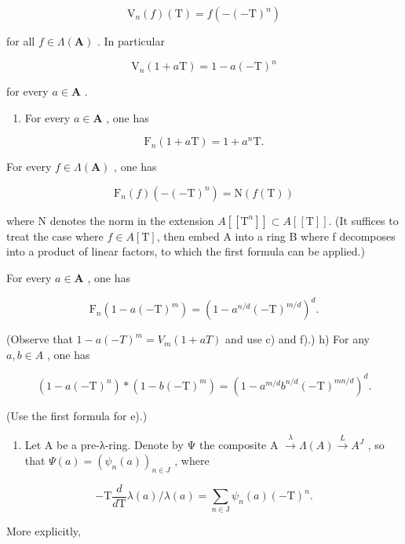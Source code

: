\[
\mathrm{V} _ {n} (f) (\mathrm{T}) = f (- (- \mathrm{T}) ^ {n})
\]

for all \(f \in \Lambda(\mathbf{A})\) . In particular

\[
\mathrm{V} _ {n} (1 + a \mathrm{T}) = 1 - a (- \mathrm{T}) ^ {n}
\]

for every \(a \in \mathbf{A}\) .

\begin{enumerate}
\def\labelenumi{\alph{enumi})}
\setcounter{enumi}{6}
\tightlist
\item
  For every \(a \in \mathbf{A}\) , one has
\end{enumerate}

\[
\mathrm{F} _ {n} (1 + a \mathrm{T}) = 1 + a ^ {n} \mathrm{T}.
\]

For every \(f \in \Lambda(\mathbf{A})\) , one has

\[
\mathrm{F} _ {n} (f) \left(- (- \mathrm{T}) ^ {n}\right) = \mathrm{N} (f (\mathrm{T}))
\]

where N denotes the norm in the extension \(A[[\mathrm{T}^{n}]] \subset A[[\mathrm{T}]]\). (It suffices to treat the case where \(f \in A[\mathrm{T}]\), then embed A into a ring B where f decomposes into a product of linear factors, to which the first formula can be applied.)

For every \(a \in \mathbf{A}\) , one has

\[
\mathrm{F} _ {n} (1 - a (- \mathrm{T}) ^ {m}) = (1 - a ^ {n / d} (- \mathrm{T}) ^ {m / d}) ^ {d}.
\]

(Observe that \(1 - a(-T)^{m} = V_{m}(1 + aT)\) and use c) and f).) h) For any \(a, b \in A\) , one has

\[
(1 - a (- \mathrm{T}) ^ {n}) * (1 - b (- \mathrm{T}) ^ {m}) = (1 - a ^ {m / d} b ^ {n / d} (- \mathrm{T}) ^ {m n / d}) ^ {d}.
\]

(Use the first formula for e).)

\begin{enumerate}
\def\labelenumi{\arabic{enumi})}
\setcounter{enumi}{47}
\tightlist
\item
  Let A be a pre-λ-ring. Denote by Ψ the composite A \(\xrightarrow{\lambda} \Lambda(A) \xrightarrow{L} A^{J}\) , so that \(\Psi(a) = (\psi_{n}(a))_{n \in J}\) , where
\end{enumerate}

\[
- \mathrm{T} \frac {d}{d \mathrm{T}} \lambda (a) / \lambda (a) = \sum_ {n \in \mathrm{J}} \psi_ {n} (a) (- \mathrm{T}) ^ {n}.
\]

More explicitly,

